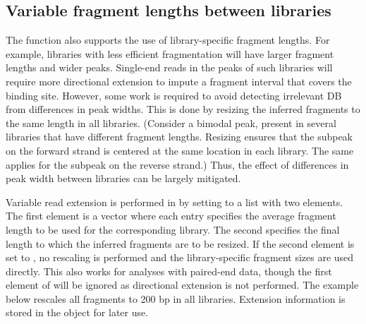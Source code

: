 \documentclass{report}\usepackage[]{graphicx}\usepackage[usenames,dvipsnames]{color}
\newcommand{\hlnum}[1]{\textcolor[rgb]{0.816,0.125,0.439}{#1}}%
\newcommand{\hlopt}[1]{\textcolor[rgb]{0,0,0}{#1}}%
\newcommand{\hlstd}[1]{\textcolor[rgb]{0.251,0.251,0.251}{#1}}%
\newcommand{\hlkwb}[1]{\textcolor[rgb]{0,0,0}{#1}}%
\newcommand{\hlkwc}[1]{\textcolor[rgb]{0.251,0.251,0.251}{#1}}%
\newcommand{\hlkwd}[1]{\textcolor[rgb]{0.878,0.439,0.125}{#1}}%
\newenvironment{knitrout}{}{} %
\begin{document}
\subsection{Variable fragment lengths between libraries}
\label{sec:coercelen}

The  function also supports the use of library-specific fragment lengths.
For example, libraries with less efficient fragmentation will have larger fragment lengths and wider peaks.
Single-end reads in the peaks of such libraries will require more directional extension to impute a fragment interval that covers the binding site.
However, some work is required to avoid detecting irrelevant DB from differences in peak widths.
This is done by resizing the inferred fragments to the same length in all libraries.
(Consider a bimodal peak, present in several libraries that have different fragment lengths.
Resizing ensures that the subpeak on the forward strand is centered at the same location in each library.
The same applies for the subpeak on the reverse strand.)
Thus, the effect of differences in peak width between libraries can be largely mitigated.

Variable read extension is performed in  by setting  to a list with two elements.
The first element is a vector where each entry specifies the average fragment length to be used for the corresponding library.
The second specifies the final length to which the inferred fragments are to be resized.
If the second element is set to , no rescaling is performed and the library-specific fragment sizes are used directly.
This also works for analyses with paired-end data, though the first element of  will be ignored as directional extension is not performed.
The example below rescales all fragments to 200 bp in all libraries.
Extension information is stored in the  object for later use.

\begin{knitrout}
\color{fgcolor}
\end{knitrout}
\end{document}
